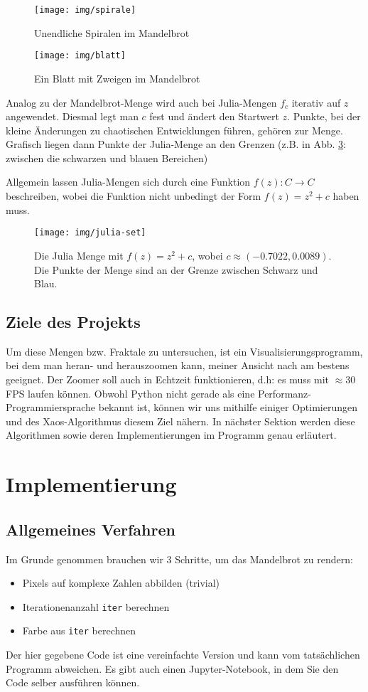 \documentclass{article}
\begin{document}
\begin{figure}
\centering
\texttt{[image: img/spirale]}
\caption{Unendliche Spiralen im Mandelbrot}
\label{fig:spiralen}
\end{figure}

\begin{figure}
\centering
\texttt{[image: img/blatt]}
\caption{Ein Blatt mit Zweigen im Mandelbrot}
\label{fig:blatt}
\end{figure}

Analog zu der Mandelbrot-Menge wird auch bei Julia-Mengen $f_c$ iterativ auf $z$ angewendet. Diesmal legt man $c$ fest und ändert den Startwert $z$. Punkte, bei der kleine Änderungen zu chaotischen Entwicklungen führen, gehören zur Menge. Grafisch liegen dann Punkte der Julia-Menge an den Grenzen (z.B. in Abb. \ref{fig:julia-set}: zwischen die schwarzen und blauen Bereichen) 

Allgemein lassen Julia-Mengen sich durch eine Funktion $f(z): C \rightarrow C$ beschreiben, wobei die Funktion nicht unbedingt der Form $f(z) = z^2 +c$ haben muss.

\begin{figure}[!htb]
\centering
\texttt{[image: img/julia-set]}
\caption{Die Julia Menge mit $f(z) = z^2 +c$, wobei $c \approx (-0.7022, 0.0089)$. Die Punkte der Menge sind an der Grenze zwischen Schwarz und Blau.}
\label{fig:julia-set}
\end{figure}


\subsection{Ziele des Projekts}	
Um diese Mengen bzw. Fraktale zu untersuchen, ist ein Visualisierungsprogramm, bei dem man heran- und herauszoomen kann, meiner Ansicht nach am bestens geeignet. Der Zoomer soll auch in Echtzeit funktionieren, d.h: es muss mit $\approx 30$ FPS laufen können. Obwohl Python nicht gerade als eine Performanz-Programmiersprache bekannt ist, können wir uns mithilfe einiger Optimierungen und des Xaos-Algorithmus diesem Ziel nähern. In nächster Sektion werden diese Algorithmen sowie deren Implementierungen im Programm genau erläutert.

\section{Implementierung}
\subsection{Allgemeines Verfahren}
Im Grunde genommen brauchen wir 3 Schritte, um das Mandelbrot zu rendern:
\begin{itemize}
\item Pixels auf komplexe Zahlen abbilden (trivial)
\item Iterationenanzahl \lstinline|iter| berechnen
\item Farbe aus \lstinline|iter| berechnen
\end{itemize}
Der hier gegebene Code ist eine vereinfachte Version und kann vom tatsächlichen Programm abweichen. Es gibt auch einen Jupyter-Notebook, in dem Sie den Code selber ausführen können.
\end{document}
